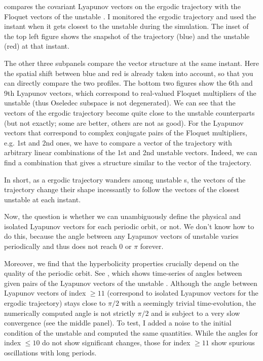 \begin{description}
 compares the covariant Lyapunov vectors on the
ergodic trajectory with the Floquet vectors of the {unstable \po}. I monitored the
ergodic trajectory and used the instant when it gets closest to the {unstable \po}
during the simulation. The inset of the top left figure shows the
snapshot of the trajectory (blue) and the {unstable \po} (red) at that instant.

The other three subpanels compare the vector structure at the same
instant. Here the spatial shift between blue and red is already taken
into account, so that you can directly compare the two profiles. The
bottom two figures show the 6th and 9th Lyapunov vectors, which correspond to
real-valued Floquet multipliers of the {unstable \po} (thus Oseledec subspace is
not degenerated). We can see that the vectors of the ergodic trajectory
become quite close to the {unstable \po} counterparts (but not exactly; some are
better, others are not as good). For the Lyapunov vectors that correspond
to complex conjugate pairs of the Floquet multipliers, e.g. 1st and 2nd
ones, we have to compare a vector of the trajectory with arbitrary
linear combinations of the 1st and 2nd {unstable \po} vectors. Indeed, we can find
a combination that gives a structure similar to the vector of the
trajectory.

In short, as a ergodic trajectory wanders among {unstable \po}s, the vectors of the
trajectory change their shape incessantly to follow the vectors of the
closest {unstable \po} at each instant.


Now, the question is whether we can unambiguously define the physical
and isolated Lyapunov vectors for each periodic orbit, or not. We don't know how to
do this, because the angle between any Lyapunov vectors
of {unstable \po} varies periodically and thus does not reach 0 or
$\pi$ forever.

Moreover, we find that the hyperbolicity properties crucially depend on
the quality of the periodic orbit. See
, which shows
time-series of angles between given pairs of the Lyapunov vectors of the
{unstable \po}. Although the angle between Lyapunov vectors of index $\geq 11$ (correspond
to isolated Lyapunov vectors for the ergodic trajectory) stays close to $\pi/2$ with a
seemingly trivial time-evolution, the numerically computed angle is not
strictly $\pi/2$ and is subject to a very slow convergence (see the middle
panel). To test, I added a noise to the initial condition of the {unstable \po} and
computed the same quantities. While the angles for index $\leq 10$ do not
show significant changes, those for index $\geq 11$ show spurious
oscillations with long periods.


\end{description}
